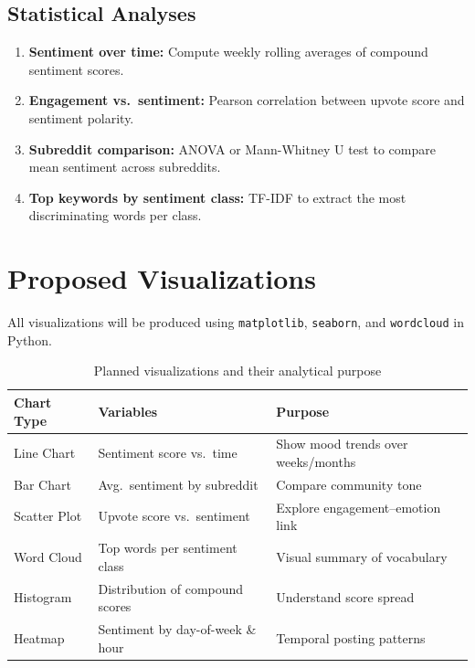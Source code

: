\documentclass[12pt, letterpaper]{article}
\begin{document}
\subsection{Statistical Analyses}

\begin{enumerate}
    \item \textbf{Sentiment over time:} Compute weekly rolling averages of compound sentiment scores.
    \item \textbf{Engagement vs.\ sentiment:} Pearson correlation between upvote score and sentiment polarity.
    \item \textbf{Subreddit comparison:} ANOVA or Mann-Whitney U test to compare mean sentiment across subreddits.
    \item \textbf{Top keywords by sentiment class:} TF-IDF to extract the most discriminating words per class.
\end{enumerate}

\section{Proposed Visualizations}

All visualizations will be produced using \texttt{matplotlib}, \texttt{seaborn}, and \texttt{wordcloud} in Python.

\begin{table}[h!]
\centering
\renewcommand{\arraystretch}{1.4}
\begin{tabular}{@{}p{3.5cm}p{4.5cm}p{5cm}@{}}
\toprule
\textbf{Chart Type} & \textbf{Variables} & \textbf{Purpose} \\
\midrule
Line Chart & Sentiment score vs.\ time & Show mood trends over weeks/months \\
Bar Chart & Avg.\ sentiment by subreddit & Compare community tone \\
Scatter Plot & Upvote score vs.\ sentiment & Explore engagement--emotion link \\
Word Cloud & Top words per sentiment class & Visual summary of vocabulary \\
Histogram & Distribution of compound scores & Understand score spread \\
Heatmap & Sentiment by day-of-week \& hour & Temporal posting patterns \\
\bottomrule
\end{tabular}
\caption{Planned visualizations and their analytical purpose}
\end{table}
\end{document}
